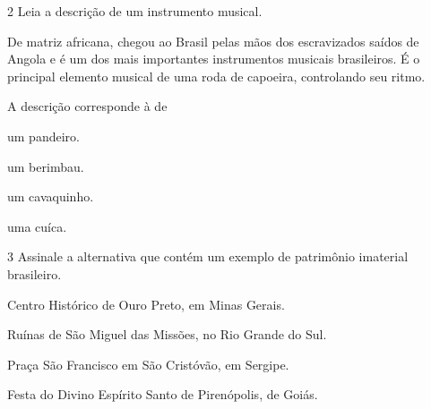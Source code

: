 \num{2}  Leia a descrição de um instrumento musical.

De matriz africana, chegou ao Brasil pelas mãos dos escravizados saídos de Angola
e é um dos mais importantes instrumentos musicais brasileiros. É o principal
elemento musical de uma roda de capoeira, controlando seu ritmo.

A descrição corresponde à de

\begin{minipage}{.5\textwidth}
\begin{escolha}
\item
  um pandeiro.
\item
  um berimbau.
\item
  um cavaquinho.
\item
  uma cuíca.
\end{escolha}
\end{minipage}

\num{3} Assinale a alternativa que contém um exemplo de patrimônio imaterial brasileiro.

\begin{escolha}
\item
  Centro Histórico de Ouro Preto, em Minas Gerais.
\item
  Ruínas de São Miguel das Missões, no Rio Grande do Sul.
\item
  Praça São Francisco em São Cristóvão, em Sergipe.
\item
  Festa do Divino Espírito Santo de Pirenópolis, de Goiás.
\end{escolha}




